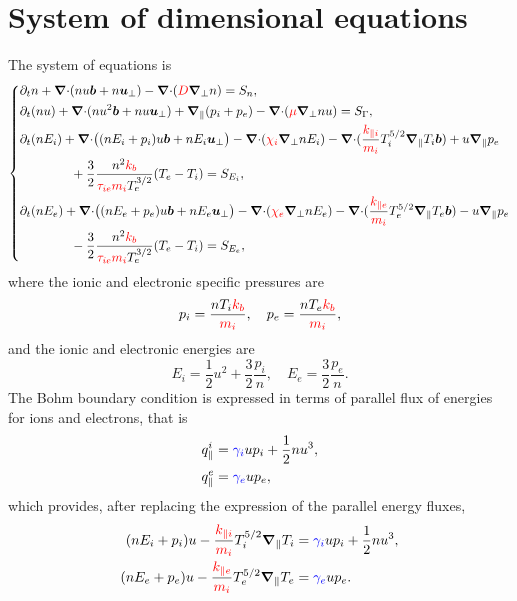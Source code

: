 \documentclass[a4paper,10pt]{article}
\newcommand{\bm}[1]{\text{\boldmath$#1$\unboldmath}}
\newcommand{\bu}{\bm{u}}
\newcommand{\Div}{{\bm{\nabla}\cdot}}
\newcommand{\Grad}{\bm{\nabla}}
\renewcommand{\b}{\bm{b}}
\newcommand{\qq}{\qquad\qquad}
\newcommand{\Gradpar}{\Grad_{\parallel}}
\newcommand{\Gradper}{\Grad_{\perp}}
\newcommand{\Gm}{\Gamma}
\newcommand{\yd}[1]{{\color{red} #1\color{black}}} %
\newcommand{\nd}[1]{{\color{blue} #1\color{black}}} %
\def\kb{\yd{k_b}}
\def\mi{\yd{m_i}}
\def\kpi{\yd{k_{\parallel i}}}
\def\kpe{\yd{k_{\parallel e}}}
\def\drho{\yd{D}}
\def\dcon{\yd{\mu}}
\def\denei{\yd{\chi_i}}
\def\denee{\yd{\chi_e}}
\def\tie{\yd{\tau_{ie}}}
\begin{document}
\section{System of dimensional equations}
The system of equations is
\begin{equation}\label{eq:model}
\left\{
\begin{aligned}
 &\partial_tn + \Div (nu\b + n \bu_\bot) - \Div (\drho \Gradper n) = S_n,\\
 &\partial_t (nu)  + \Div (nu^2\b + nu \bu_\bot) +  \Gradpar(p_i+p_e) - \Div (\dcon \Gradper nu) =S_{\Gm},\\
 &\partial_t (nE_i)  + \Div \big( (nE_i+p_i)u\b + nE_i \bu_\bot \big) - \Div (\denei \Gradper nE_i) - \Div (\frac{\kpi}{\mi} T_i^{5/2}\Gradpar T_i\b) +u\Gradpar p_e\\ &\qq+ \frac{3}{2}\frac{n^2 \kb}{\tie \mi T_e^{3/2}}(T_e-T_i) =S_{E_i},\\
 &\partial_t (nE_e)  + \Div \big( (nE_e+p_e)u\b + nE_e \bu_\bot \big) - \Div (\denee \Gradper nE_e) - \Div (\frac{\kpe}{\mi} T_e^{5/2}\Gradpar T_e\b) -u\Gradpar p_e\\ &\qq-\frac{3}{2}\frac{n^2 \kb}{\tie\mi T_e^{3/2}}(T_e-T_i)=S_{E_e},
 \end{aligned}\right.
\end{equation}
where the ionic and electronic specific pressures are
\begin{equation}
 p_i=\frac{nT_i \kb}{\mi}, \quad p_e=\frac{nT_e \kb}{\mi},
\end{equation}
and the ionic and electronic energies are
\begin{equation}
 E_i=\frac{1}{2}u^2+\frac{3}{2}\frac{p_i}{n}, \quad E_e=\frac{3}{2}\frac{p_e}{n}.
\end{equation}
The Bohm boundary condition is expressed in terms of parallel flux of energies for ions and electrons, that is
\begin{equation*}
\begin{aligned}
 q_{\parallel}^i &= \nd{\gamma_i} u p_i + \frac{1}{2} n u^3,\\
 q_{\parallel}^e &= \nd{\gamma_e} u p_e,
\end{aligned}
\end{equation*}
which provides, after replacing the expression of the parallel energy fluxes, 
\begin{equation}\label{eq:bohm}
\begin{aligned}
 (n E_i + p_i)u - \frac{\kpi}{\mi} T_i^{5/2}\Gradpar T_i &= \nd{\gamma_i} u p_i + \frac{1}{2} n u^3,\\
 (n E_e + p_e)u - \frac{\kpe}{\mi} T_e^{5/2}\Gradpar T_e &= \nd{\gamma_e} u p_e.
\end{aligned}
\end{equation}
\end{document}
